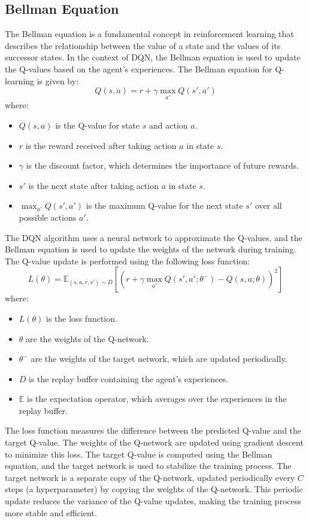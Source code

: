 \subsection{Bellman Equation}

The Bellman equation is a fundamental concept in reinforcement learning that describes the relationship between the value of a state and the values of its successor states.
In the context of DQN, the Bellman equation is used to update the Q-values based on the agent's experiences.
The Bellman equation for Q-learning is given by:
\begin{equation}
      Q(s, a) = r + \gamma \max_{a'} Q(s', a')
\end{equation}
where:
\begin{itemize}
      \item $Q(s, a)$ is the Q-value for state $s$ and action $a$.
      \item $r$ is the reward received after taking action $a$ in state $s$.
      \item $\gamma$ is the discount factor, which determines the importance of future rewards.
      \item $s'$ is the next state after taking action $a$ in state $s$.
      \item $\max_{a'} Q(s', a')$ is the maximum Q-value for the next state $s'$ over all possible actions $a'$.
\end{itemize}
The DQN algorithm uses a neural network to approximate the Q-values, and the Bellman equation is used to update the weights of the network during training.
The Q-value update is performed using the following loss function:
\begin{equation}
      L(\theta) = \mathbb{E}_{(s, a, r, s') \sim D} \left[ \left( r + \gamma \max_{a'} Q(s', a'; \theta^-) - Q(s, a; \theta) \right)^2 \right]
\end{equation}
where:
\begin{itemize}
      \item $L(\theta)$ is the loss function.
      \item $\theta$ are the weights of the Q-network.
      \item $\theta^-$ are the weights of the target network, which are updated periodically.
      \item $D$ is the replay buffer containing the agent's experiences.
      \item $\mathbb{E}$ is the expectation operator, which averages over the experiences in the replay buffer.
\end{itemize}
The loss function measures the difference between the predicted Q-value and the target Q-value. The weights of the Q-network are updated using gradient descent to minimize this loss.
The target Q-value is computed using the Bellman equation, and the target network is used to stabilize the training process.
The target network is a separate copy of the Q-network, updated periodically every $C$ steps (a hyperparameter) by copying the weights of the Q-network.
This periodic update reduces the variance of the Q-value updates, making the training process more stable and efficient.


